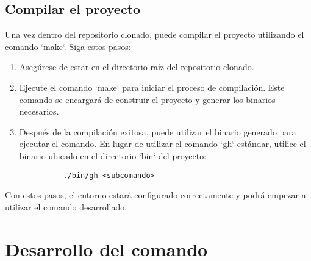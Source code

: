 \subsection{Compilar el proyecto}

Una vez dentro del repositorio clonado, puede compilar el proyecto utilizando el comando `make`. Siga estos pasos:

\begin{enumerate}
  \item Asegúrese de estar en el directorio raíz del repositorio clonado.
  \item Ejecute el comando `make` para iniciar el proceso de compilación. Este comando se encargará de construir el proyecto y generar los binarios necesarios.
  \item Después de la compilación exitosa, puede utilizar el binario generado para ejecutar el comando. En lugar de utilizar el comando `gh` estándar, utilice el binario ubicado en el directorio `bin` del proyecto:
        \begin{verbatim}
          ./bin/gh <subcomando>
        \end{verbatim}
\end{enumerate}

Con estos pasos, el entorno estará configurado correctamente y podrá empezar a utilizar el comando desarrollado.

\section{Desarrollo del comando}

